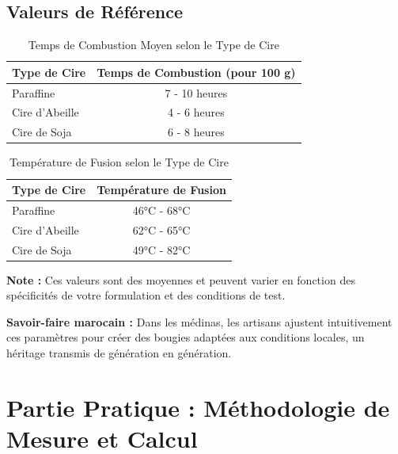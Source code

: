 \documentclass[11pt,fleqn,onecolumn,oneside]{book}
\begin{document}
\subsection*{Valeurs de Référence}

\begin{table}[H]
    \centering
    \caption{Temps de Combustion Moyen selon le Type de Cire}
    \label{tab:temps_combustion}
    \begin{tabular}{|l|c|}
        \hline
        \textbf{Type de Cire} & \textbf{Temps de Combustion (pour 100 g)} \\
        \hline
        Paraffine & 7 - 10 heures \\
        Cire d'Abeille & 4 - 6 heures \\
        Cire de Soja & 6 - 8 heures \\
        \hline
    \end{tabular}
\end{table}

\begin{table}[H]
    \centering
    \caption{Température de Fusion selon le Type de Cire}
    \label{tab:temperature_fusion}
    \begin{tabular}{|l|c|}
        \hline
        \textbf{Type de Cire} & \textbf{Température de Fusion} \\
        \hline
        Paraffine & 46°C - 68°C \\
        Cire d'Abeille & 62°C - 65°C \\
        Cire de Soja & 49°C - 82°C \\
        \hline
    \end{tabular}
\end{table}

\begin{remark}
\textbf{Note :} Ces valeurs sont des moyennes et peuvent varier en fonction des spécificités de votre formulation et des conditions de test.
\end{remark}

\begin{remark}
\textbf{Savoir-faire marocain :} Dans les médinas, les artisans ajustent intuitivement ces paramètres pour créer des bougies adaptées aux conditions locales, un héritage transmis de génération en génération.
\end{remark}

\section{Partie Pratique : Méthodologie de Mesure et Calcul}
\end{document}

